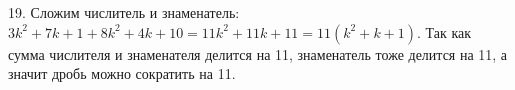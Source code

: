 19. Сложим числитель и знаменатель: $3k^2+7k+1+8k^2+4k+10=11k^2+11k+11=11(k^2+k+1).$ Так как сумма числителя и знаменателя делится на 11, знаменатель тоже делится на 11, а значит дробь можно сократить на 11.\\
